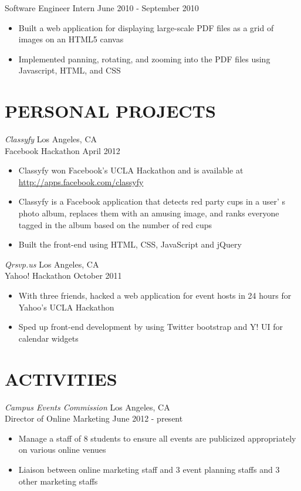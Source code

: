 \documentclass{res}
\begin{document}
\begin{resume}
 Software Engineer Intern \hfill    June 2010 - September 2010

 \begin{itemize} \itemsep -2pt
   \item  Built a web application for displaying large-scale PDF files as a grid of images on an HTML5 canvas
   \item Implemented panning, rotating, and zooming into the PDF files using Javascript, HTML, and CSS
 \end{itemize} \vspace{-6pt}

\section{PERSONAL PROJECTS}
\vspace{6pt}

 {\sl Classyfy} \hfill Los Angeles, CA\\
Facebook Hackathon \hfill April 2012
   \begin{itemize} \itemsep -2pt
     \item  Classyfy won Facebook's UCLA Hackathon and is available at \underline{http://apps.facebook.com/classyfy}
     \item Classyfy is a Facebook application that detects red party cups in a user'
     s photo album, replaces them with an amusing image, and ranks everyone tagged in the album based on the number of red cups
     \item Built the front-end using HTML, CSS, JavaScript and jQuery
  \end{itemize} \vspace{-6pt}

 {\sl Qrsvp.us} \hfill Los Angeles, CA \\
Yahoo! Hackathon \hfill October 2011
  \begin{itemize} \itemsep -2pt
    \item  With three friends, hacked a web application for event hosts in 24 hours for Yahoo's UCLA Hackathon
    \item Sped up front-end development by using Twitter bootstrap and Y! UI for calendar widgets
  \end{itemize} \vspace{-6pt}

\section{ACTIVITIES}
\vspace{6pt}
  {\sl Campus Events Commission} \hfill Los Angeles, CA \\
  Director of Online Marketing \hfill June 2012 - present
  \begin{itemize} \itemsep -2pt
    \item Manage a staff of 8 students to ensure all events are publicized appropriately on various online venues
    \item Liaison between online marketing staff and 3 event planning staffs and 3 other marketing staffs
  \end{itemize} \vspace{-6pt}


\end{resume}
\end{document}
